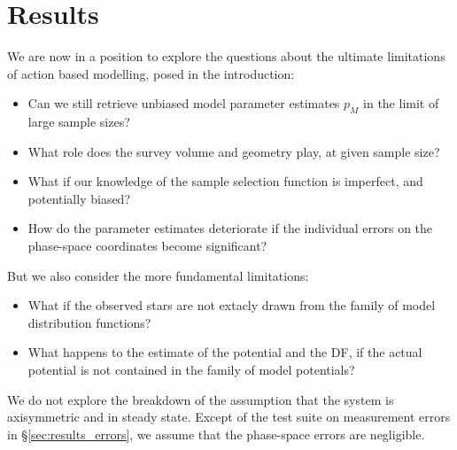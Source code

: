 \section{Results} \label{sec:results}

We are now in a position to explore the questions about the ultimate limitations of action based modelling, posed in the introduction: 
\begin{itemize}
\item Can we still retrieve unbiased  model parameter estimates $p_M$ in the limit of large sample sizes? 
\item What role does the survey volume and geometry play, at given sample size? 
\item What if our knowledge of the sample selection function is imperfect, and potentially biased? 
\item How do the parameter estimates deteriorate if the individual errors on the phase-space coordinates become significant? 
\end{itemize}
But we also consider the more fundamental limitations:
\begin{itemize}
\item What if the observed stars are not extacly drawn from the family of model distribution functions? 
\item What happens to the estimate of the potential and the DF, if the actual potential is not contained in the family of model potentials?
\end{itemize}
We do not explore the breakdown of the assumption that the system is axisymmetric and in steady state. Except of the test suite on measurement errors in \S\ref{sec:results_errors}, we assume that the phase-space errors are negligible.





